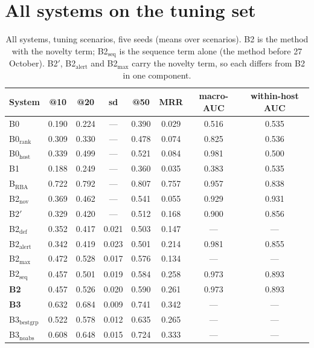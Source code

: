 \documentclass[10.5pt,a4paper]{article}
\begin{document}
\section{All systems on the tuning set}
\begin{table}[h]\centering\small
\caption{All systems, tuning scenarios, five seeds (means over scenarios). B2 is the method with the novelty term; B2$_\mathrm{seq}$ is the sequence term alone (the method before 27 October). B2$'$, B2$_\mathrm{alert}$ and B2$_\mathrm{max}$ carry the novelty term, so each differs from B2 in one component.}
\label{tab:all}
\begin{tabular}{@{}l cccccc c@{}}
\toprule
System & @10 & @20 & sd & @50 & MRR & macro-AUC & within-host AUC \\
\midrule
B0 & 0.190 & 0.224 & --- & 0.390 & 0.029 & 0.516 & 0.535 \\
B0$_\mathrm{rank}$ & 0.309 & 0.330 & --- & 0.478 & 0.074 & 0.825 & 0.536 \\
B0$_\mathrm{host}$ & 0.339 & 0.499 & --- & 0.521 & 0.084 & 0.981 & 0.500 \\
B1 & 0.188 & 0.249 & --- & 0.360 & 0.035 & 0.383 & 0.535 \\
B$_\mathrm{RBA}$ & 0.722 & 0.792 & --- & 0.807 & 0.757 & 0.957 & 0.838 \\
B2$_\mathrm{nov}$ & 0.369 & 0.462 & --- & 0.541 & 0.055 & 0.929 & 0.931 \\
B2$'$ & 0.329 & 0.420 & --- & 0.512 & 0.168 & 0.900 & 0.856 \\
B2$_\mathrm{def}$ & 0.352 & 0.417 & 0.021 & 0.503 & 0.147 & --- & --- \\
B2$_\mathrm{alert}$ & 0.342 & 0.419 & 0.023 & 0.501 & 0.214 & 0.981 & 0.855 \\
B2$_\mathrm{max}$ & 0.472 & 0.528 & 0.017 & 0.576 & 0.134 & --- & --- \\
B2$_\mathrm{seq}$ & 0.457 & 0.501 & 0.019 & 0.584 & 0.258 & 0.973 & 0.893 \\
\textbf{B2} & 0.457 & 0.526 & 0.020 & 0.590 & 0.261 & 0.973 & 0.893 \\
\textbf{B3} & 0.632 & 0.684 & 0.009 & 0.741 & 0.342 & --- & --- \\
B3$_\mathrm{bestgrp}$ & 0.522 & 0.578 & 0.012 & 0.635 & 0.265 & --- & --- \\
B3$_\mathrm{noabs}$ & 0.608 & 0.648 & 0.015 & 0.724 & 0.333 & --- & --- \\
\bottomrule
\end{tabular}
\end{table}
\end{document}
